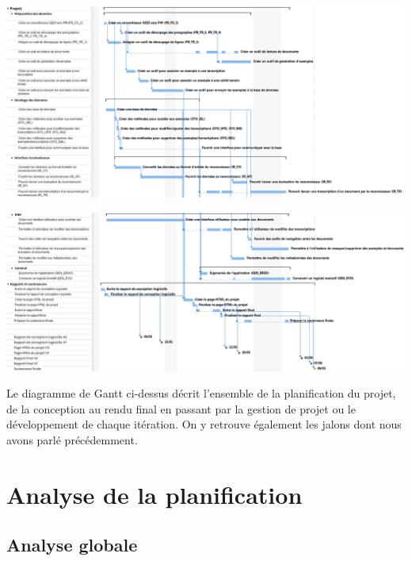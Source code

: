 \begin{mdframed}[frametitle={Figure 3 : Diagramme de Gantt du projet (1/2)}, innerbottommargin=10]
\begin{center}
\includegraphics[scale=0.35]{gantt_V2.1.PNG}
\end{center}
\end{mdframed}

\begin{mdframed}[frametitle={Figure 4 : Diagramme de Gantt du projet (2/2)}, innerbottommargin=10]
\begin{center}
\includegraphics[scale=0.35]{gantt_V2.2.PNG}
\end{center}
\end{mdframed}

Le diagramme de Gantt ci-dessus décrit l’ensemble de la planification du projet, de la conception au rendu final en passant par la gestion de projet ou le développement de chaque itération. On y retrouve également les jalons dont nous avons parlé précédemment.

\section{Analyse de la planification}

\subsection{Analyse globale}

